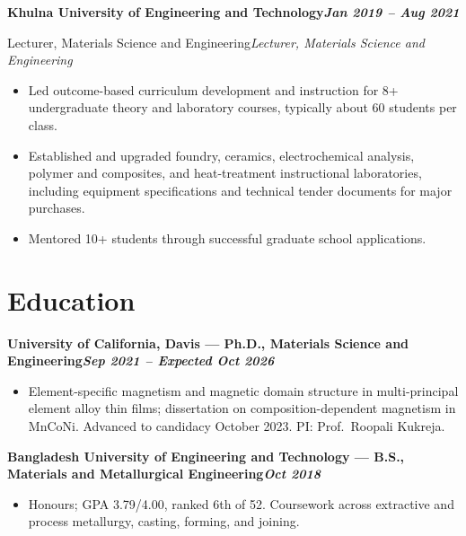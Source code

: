 \documentclass[10pt,letterpaper]{article}
\newcommand{\entry}[3]{%
  \vspace{0.3em}%
  \noindent\textbf{#1}\hfill\textbf{\textit{#2}}\par
  \def\tempthird{#3}\ifx\tempthird\empty\else\noindent\textit{#3}\par\fi
  \vspace{0.05em}%
}
\begin{document}
\entry{Khulna University of Engineering and Technology}{Jan 2019 -- Aug 2021}{Lecturer, Materials Science and Engineering}
\begin{itemize}
  \item Led outcome-based curriculum development and instruction for 8+ undergraduate theory and
        laboratory courses, typically about 60 students per class.
  \item Established and upgraded foundry, ceramics, electrochemical analysis, polymer and
        composites, and heat-treatment instructional laboratories, including equipment
        specifications and technical tender documents for major purchases.
  \item Mentored 10+ students through successful graduate school applications.
\end{itemize}

\section{Education}

\entry{University of California, Davis --- Ph.D., Materials Science and Engineering}{Sep 2021 -- Expected Oct 2026}{}
\begin{itemize}
  \item Element-specific magnetism and magnetic domain structure in multi-principal element alloy
        thin films; dissertation on composition-dependent magnetism in MnCoNi. Advanced to
        candidacy October 2023. PI: Prof.\ Roopali Kukreja.
\end{itemize}

\entry{Bangladesh University of Engineering and Technology --- B.S., Materials and Metallurgical Engineering}{Oct 2018}{}
\begin{itemize}
  \item Honours; GPA 3.79/4.00, ranked 6th of 52. Coursework across extractive and process
        metallurgy, casting, forming, and joining.
\end{itemize}

\end{document}
